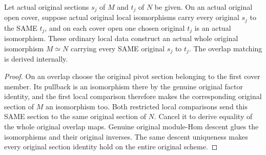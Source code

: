\begin{theorem}
\label{thm:fc-section-preserving-global-gluing}
\leanok
{}
Let actual original sections $s_j$ of $M$ and $t_j$ of $N$ be
given. On an actual original open cover, suppose actual original
local isomorphisms carry every original $s_j$ to the SAME $t_j$,
and on each cover open one chosen original $t_j$ is an actual
isomorphism. These ordinary local data construct an actual whole
original isomorphism $M\simeq N$ carrying every SAME original
$s_j$ to $t_j$. The overlap matching is derived internally.
\end{theorem}
\begin{proof}
On an overlap choose the original pivot section belonging to the
first cover member. Its pullback is an isomorphism there by the
genuine original factor identity, and the first local comparison
therefore makes the corresponding original section of $M$ an
isomorphism too. Both restricted local comparisons send this SAME
section to the same original section of $N$. Cancel it to derive
equality of the whole original overlap maps. Genuine original
module-Hom descent glues the isomorphisms and their original
inverses. The same descent uniqueness makes every original
section identity hold on the entire original scheme.
\end{proof}
